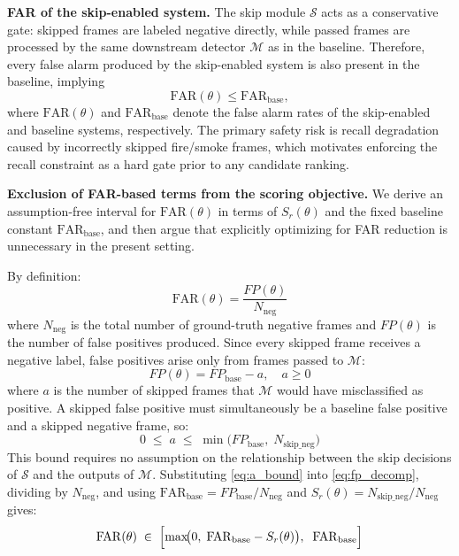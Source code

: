 \textbf{FAR of the skip-enabled system.} The skip module $\mathcal{S}$ acts as
a conservative gate: skipped frames are labeled negative directly, while passed
frames are processed by the same downstream detector $\mathcal{M}$ as in the
baseline. Therefore, every false alarm produced by the skip-enabled system is
also present in the baseline, implying
\begin{equation}
    \mathrm{FAR}(\theta) \leq \mathrm{FAR}_{\text{base}},
\end{equation}
where $\mathrm{FAR}(\theta)$ and $\mathrm{FAR}_{\text{base}}$ denote the false
alarm rates of the skip-enabled and baseline systems, respectively. The primary
safety risk is recall degradation caused by incorrectly skipped fire/smoke
frames, which motivates enforcing the recall constraint as a hard gate prior to
any candidate ranking.

\textbf{Exclusion of FAR-based terms from the scoring objective.}
We derive an assumption-free interval for $\mathrm{FAR}(\theta)$ in terms of
$S_r(\theta)$ and the fixed baseline constant
$\mathrm{FAR}_{\text{base}}$, and then argue that explicitly optimizing
for FAR reduction is unnecessary in the present setting.

By definition:
\begin{equation}\label{eq:far_def}
    \mathrm{FAR}(\theta) = \frac{FP(\theta)}{N_{\text{neg}}}
\end{equation}
where $N_{\text{neg}}$ is the total number of ground-truth negative frames
and $FP(\theta)$ is the number of false positives produced.
Since every skipped frame receives a negative label, false positives arise
only from frames passed to $\mathcal{M}$:
\begin{equation}\label{eq:fp_decomp}
    FP(\theta) = FP_{\text{base}} - a, \quad a \geq 0
\end{equation}
where $a$ is the number of skipped frames that $\mathcal{M}$ would have
misclassified as positive.
A skipped false positive must simultaneously be a baseline false positive
and a skipped negative frame, so:
\begin{equation}\label{eq:a_bound}
    0 \;\leq\; a \;\leq\; \min\!\bigl(FP_{\text{base}},\;N_{\text{skip\_neg}}\bigr)
\end{equation}
This bound requires no assumption on the relationship between the skip
decisions of $\mathcal{S}$ and the outputs of $\mathcal{M}$.
Substituting \eqref{eq:a_bound} into \eqref{eq:fp_decomp}, dividing by
$N_{\text{neg}}$, and using
$\mathrm{FAR}_{\text{base}} = FP_{\text{base}}/N_{\text{neg}}$ and
$S_r(\theta) = N_{\text{skip\_neg}}/N_{\text{neg}}$ gives:
\begin{equation}\label{eq:far_interval}
    \mathrm{FAR}(\theta)
    \;\in\;
    \Bigl[
        \max\!\bigl(0,\;\mathrm{FAR}_{\text{base}} - S_r(\theta)\bigr),
        \;\;
        \mathrm{FAR}_{\text{base}}
    \Bigr]
\end{equation}

